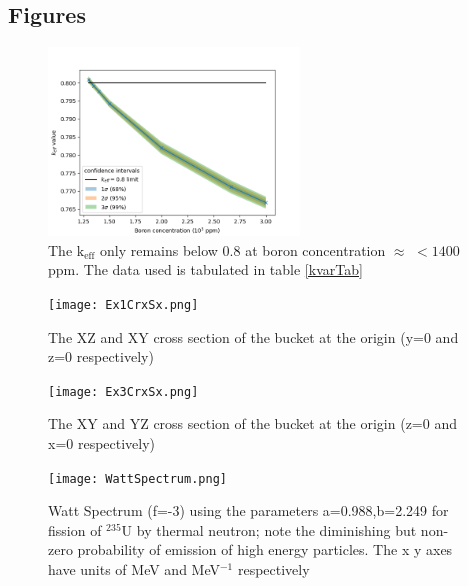 \documentclass[a4paper, 11pt]{article}
\begin{document}
\begin{appendices}
\section{Figures}

\begin{figure}[H]
\centering
\includegraphics[height=5cm]{ConfidenceInterval.png}
\caption{The $\text{k}_{\text{eff}}$ only remains below 0.8 at boron concentration $\approx$ $<1400$ ppm. The data used is tabulated in table \ref{kvarTab}
}\label{ConfInt}
\end{figure}

\begin{figure}[H]
\centering
\texttt{[image: Ex1CrxSx.png]}
\caption{The XZ and XY cross section of the bucket at the origin (y=0 and z=0 respectively)
}\label{Ex1CrxSx}
\end{figure}

\begin{figure}[H]
\centering
\texttt{[image: Ex3CrxSx.png]}
\caption{The XY and YZ cross section of the bucket at the origin (z=0 and x=0 respectively)
}\label{Ex3CrxSx}
\end{figure}

\begin{figure}[H]
\centering
\texttt{[image: WattSpectrum.png]}
\caption{Watt Spectrum (f=-3) using the parameters a=0.988,b=2.249 for fission of ${}^{235}$U by thermal neutron;
note the diminishing but non-zero probability of emission of high energy particles.
The x y axes have units of MeV and MeV$^{-1}$ respectively
}\label{Watt}
\end{figure}


\end{appendices}
\end{document}
